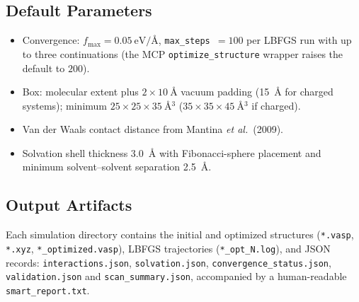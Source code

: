 \subsection{Default Parameters}

\begin{itemize}
\item Convergence: $f_{\max} = \SI{0.05}{\eV/\angstrom}$,
  \texttt{max\_steps}~$=100$ per LBFGS run with up to three
  continuations (the MCP \texttt{optimize\_structure} wrapper raises
  the default to $200$).
\item Box: molecular extent plus $2 \times \SI{10}{\angstrom}$ vacuum
  padding (\SI{15}{\angstrom} for charged systems);
  minimum $25 \times 25 \times \SI{35}{\angstrom^{3}}$
  ($35 \times 35 \times \SI{45}{\angstrom^{3}}$ if charged).
\item Van der Waals contact distance from Mantina \emph{et al.}\
  (2009).
\item Solvation shell thickness \SI{3.0}{\angstrom} with Fibonacci-sphere
  placement and minimum solvent--solvent separation
  \SI{2.5}{\angstrom}.
\end{itemize}

\subsection{Output Artifacts}

Each simulation directory contains the initial and optimized structures
(\texttt{*.vasp}, \texttt{*.xyz}, \texttt{*\_optimized.vasp}), LBFGS
trajectories (\texttt{*\_opt\_N.log}), and JSON records:
\texttt{interactions.json}, \texttt{solvation.json},
\texttt{convergence\_status.json}, \texttt{validation.json} and
\texttt{scan\_summary.json}, accompanied by a human-readable
\texttt{smart\_report.txt}.
